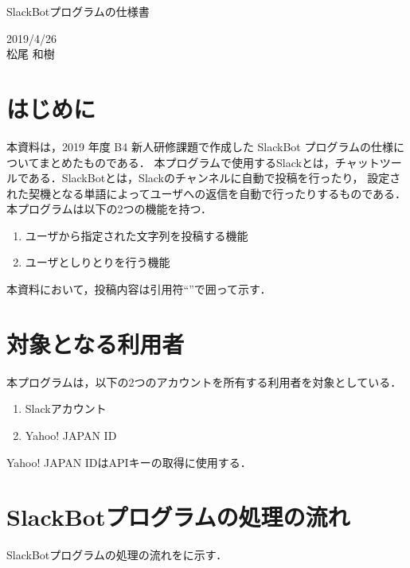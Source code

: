 \documentclass[12pt]{jsarticle}
\begin{document}
\begin{center}
{\LARGE SlackBotプログラムの仕様書}
\end{center}

\begin{flushright}
  2019/4/26\\
  松尾 和樹
\end{flushright}
\section{はじめに}
\label{sec:introduction}
本資料は，2019 年度 B4 新人研修課題で作成した SlackBot プログラムの仕様についてまとめたものである．
本プログラムで使用するSlack\cite{slack}とは，チャットツールである．SlackBotとは，Slackのチャンネルに自動で投稿を行ったり，
設定された契機となる単語によってユーザへの返信を自動で行ったりするものである．
本プログラムは以下の2つの機能を持つ．
\begin{enumerate}
\item ユーザから指定された文字列を投稿する機能
\item ユーザとしりとりを行う機能
\end{enumerate}
本資料において，投稿内容は引用符``''で囲って示す．


\section{対象となる利用者}\label{sec:target}
本プログラムは，以下の2つのアカウントを所有する利用者を対象としている．

\begin{enumerate}
    \item Slackアカウント
    \item Yahoo! JAPAN ID
\end{enumerate}

Yahoo! JAPAN IDはAPIキーの取得に使用する．

\section{SlackBotプログラムの処理の流れ}
SlackBotプログラムの処理の流れをに示す．
\end{document}
